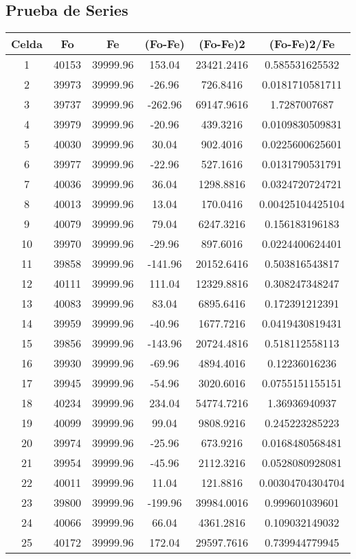 \documentclass{article}
\begin{document}
\subsection{Prueba de Series}
\begin{tabular}{|c|c|c|c|c|c|}
Celda&Fo&Fe&(Fo{-}Fe)&(Fo{-}Fe)2&(Fo{-}Fe)2/Fe\\
\hline
1&40153&39999.96&153.04&23421.2416&0.585531625532\\
\hline
2&39973&39999.96&{-}26.96&726.8416&0.0181710581711\\
\hline
3&39737&39999.96&{-}262.96&69147.9616&1.7287007687\\
\hline
4&39979&39999.96&{-}20.96&439.3216&0.0109830509831\\
\hline
5&40030&39999.96&30.04&902.4016&0.0225600625601\\
\hline
6&39977&39999.96&{-}22.96&527.1616&0.0131790531791\\
\hline
7&40036&39999.96&36.04&1298.8816&0.0324720724721\\
\hline
8&40013&39999.96&13.04&170.0416&0.00425104425104\\
\hline
9&40079&39999.96&79.04&6247.3216&0.156183196183\\
\hline
10&39970&39999.96&{-}29.96&897.6016&0.0224400624401\\
\hline
11&39858&39999.96&{-}141.96&20152.6416&0.503816543817\\
\hline
12&40111&39999.96&111.04&12329.8816&0.308247348247\\
\hline
13&40083&39999.96&83.04&6895.6416&0.172391212391\\
\hline
14&39959&39999.96&{-}40.96&1677.7216&0.0419430819431\\
\hline
15&39856&39999.96&{-}143.96&20724.4816&0.518112558113\\
\hline
16&39930&39999.96&{-}69.96&4894.4016&0.12236016236\\
\hline
17&39945&39999.96&{-}54.96&3020.6016&0.0755151155151\\
\hline
18&40234&39999.96&234.04&54774.7216&1.36936940937\\
\hline
19&40099&39999.96&99.04&9808.9216&0.245223285223\\
\hline
20&39974&39999.96&{-}25.96&673.9216&0.0168480568481\\
\hline
21&39954&39999.96&{-}45.96&2112.3216&0.0528080928081\\
\hline
22&40011&39999.96&11.04&121.8816&0.00304704304704\\
\hline
23&39800&39999.96&{-}199.96&39984.0016&0.999601039601\\
\hline
24&40066&39999.96&66.04&4361.2816&0.109032149032\\
\hline
25&40172&39999.96&172.04&29597.7616&0.739944779945\\
\end{tabular}
\end{document}
